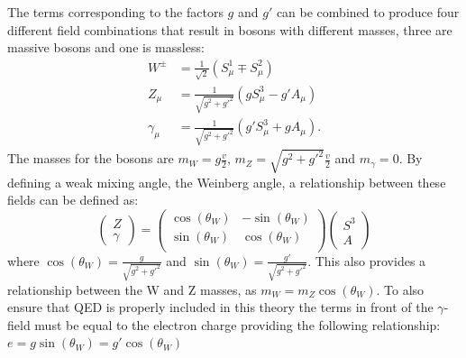 The terms corresponding to the factors $g$ and $g'$ can be combined to produce four different field combinations that result in bosons with different masses, three are massive bosons and one is massless:
\begin{align}
W^\pm &= \frac{1}{\sqrt{2}}(S_\mu^1 \mp S_\mu^2)\\
Z_\mu &= \frac{1}{\sqrt{g^2+g'^2}}(gS_\mu^3 - g' A_\mu)\\
\gamma_\mu &= \frac{1}{\sqrt{g^2+g'^2}}(g'S_\mu^3 + g A_\mu).
\end{align}
The masses for the bosons are  $m_W = g\frac{v}{2}$, $m_Z = \sqrt{g^2+g'^2}\frac{v}{2}$ and $m_\gamma = 0$. By defining a weak mixing angle, the Weinberg angle, a relationship between these fields can be defined as:
\begin{equation}
\begin{pmatrix}
    Z\\
 \gamma
\end{pmatrix}
=
\begin{pmatrix}
    \cos(\theta_W) & -\sin(\theta_W)\\
    \sin(\theta_W) & \cos(\theta_W)\\
\end{pmatrix}
\begin{pmatrix}
    S^3\\
  A
\end{pmatrix}
\end{equation}
where $\cos(\theta_W) = \frac{g}{\sqrt{g^2+g'^2}}$ and $\sin(\theta_W) = \frac{g'}{\sqrt{g^2+g'^2}}$. This also provides a relationship between the W and Z masses, as $m_W = m_Z \cos(\theta_W)$. To also ensure that QED is properly included in this theory the terms in front of the $\gamma$-field must be equal to the electron charge providing the following relationship:
$e = g \sin(\theta_W) = g' \cos(\theta_W)$


